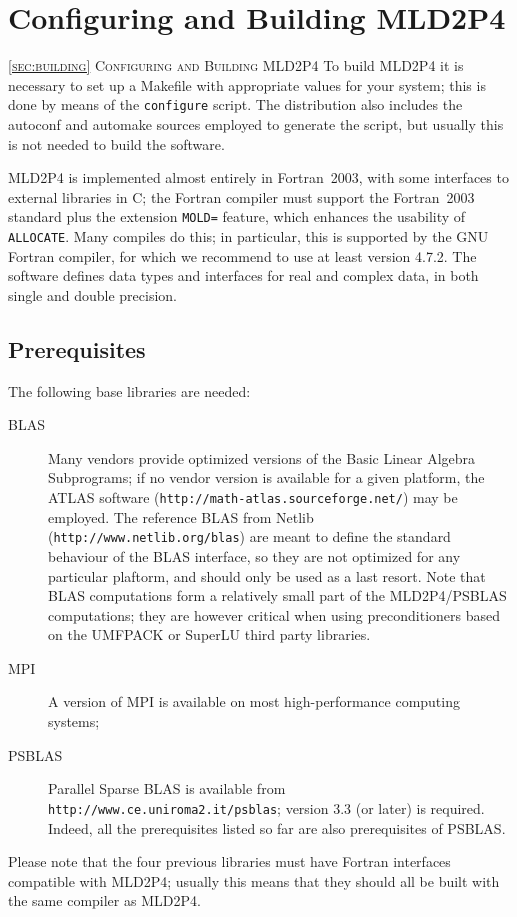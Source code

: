 \section{Configuring and Building MLD2P4\label{sec:building}}
         {\textsc{\ref{sec:building} Configuring and Building MLD2P4}}
To build MLD2P4 it is necessary to set up a Makefile with appropriate
values for your system; this is done by means of the \verb|configure|
script. The distribution also includes the autoconf and automake
sources employed to generate the script, but usually this is not needed
to build the software. 

MLD2P4 is implemented almost entirely in Fortran~2003, with some
interfaces to external libraries in C; the Fortran compiler
must support the Fortran~2003 standard plus the extension \verb|MOLD=|
feature, which
enhances the usability of \verb|ALLOCATE|. 
Many compiles do this; in particular, this is
supported by the GNU Fortran compiler, for which we 
recommend to use at least version 4.7.2. 
The software defines data types and interfaces for
real and complex data, in both single and double precision. 

\subsection{Prerequisites}

The following base libraries are needed: 
\begin{description}
\item[BLAS] \cite{blas3,blas2,blas1} Many vendors provide optimized versions
  of the Basic Linear Algebra Subprograms; if no vendor version is
  available for a given platform, the ATLAS software
  (\verb!http://math-atlas.sourceforge.net/!)
  may be employed.  The reference BLAS from Netlib
  (\verb|http://www.netlib.org/blas|) are meant to define the standard
  behaviour of the BLAS interface, so they are not optimized for any
  particular plaftorm, and should only be used as a last
  resort. Note that BLAS computations form a relatively small part of
  the MLD2P4/PSBLAS computations; they are however critical when using
  preconditioners based on the UMFPACK or SuperLU third party
  libraries.  
\item[MPI] \cite{MPI2,MPI1} A version of MPI is available on most
  high-performance computing systems;
 \item[PSBLAS] \cite{PSBLASGUIDE,psblas_00} Parallel Sparse BLAS is
  available from \\ \verb|http://www.ce.uniroma2.it/psblas|; version
  3.3   (or later) is required. Indeed, all the prerequisites
  listed so far are also prerequisites of PSBLAS.
\end{description}
Please note that the four previous libraries must have Fortran
interfaces compatible with MLD2P4;
usually this means that they should all be built with the same
compiler as MLD2P4.

